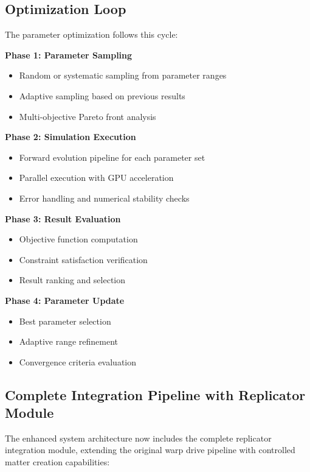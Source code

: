 \documentclass[11pt]{article}
\begin{document}
\subsection{Optimization Loop}

The parameter optimization follows this cycle:

\textbf{Phase 1: Parameter Sampling}
\begin{itemize}
\item Random or systematic sampling from parameter ranges
\item Adaptive sampling based on previous results
\item Multi-objective Pareto front analysis
\end{itemize}

\textbf{Phase 2: Simulation Execution}
\begin{itemize}
\item Forward evolution pipeline for each parameter set
\item Parallel execution with GPU acceleration
\item Error handling and numerical stability checks
\end{itemize}

\textbf{Phase 3: Result Evaluation}
\begin{itemize}
\item Objective function computation
\item Constraint satisfaction verification
\item Result ranking and selection
\end{itemize}

\textbf{Phase 4: Parameter Update}
\begin{itemize}
\item Best parameter selection
\item Adaptive range refinement
\item Convergence criteria evaluation
\end{itemize}

\subsection{Complete Integration Pipeline with Replicator Module}

The enhanced system architecture now includes the complete replicator integration module, extending the original warp drive pipeline with controlled matter creation capabilities:
\end{document}
